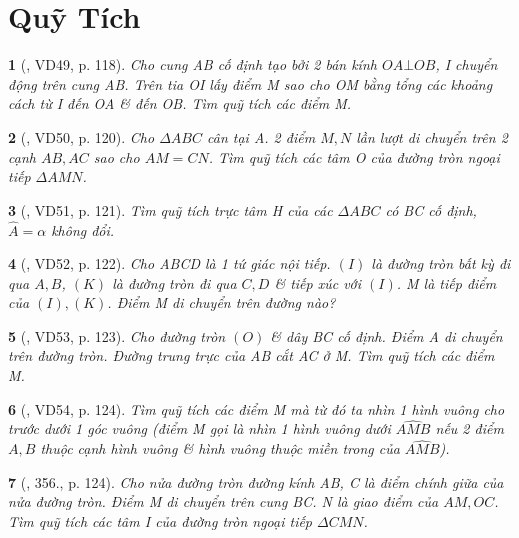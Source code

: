 \documentclass{article}
\newtheorem{baitoan}{}
\begin{document}
\section{Quỹ Tích}

\begin{baitoan}[\cite{Binh_Toan_9_tap_2}, VD49, p. 118]
	Cho cung AB cố định tạo bởi 2 bán kính $OA\bot OB$, I chuyển động trên cung AB. Trên tia OI lấy điểm M sao cho OM bằng tổng các khoảng cách từ I đến OA \& đến OB. Tìm quỹ tích các điểm M.
\end{baitoan}

\begin{baitoan}[\cite{Binh_Toan_9_tap_2}, VD50, p. 120]
	Cho $\Delta ABC$ cân tại A. 2 điểm $M,N$ lần lượt di chuyển trên 2 cạnh $AB,AC$ sao cho $AM = CN$. Tìm quỹ tích các tâm O của đường tròn ngoại tiếp $\Delta AMN$.
\end{baitoan}

\begin{baitoan}[\cite{Binh_Toan_9_tap_2}, VD51, p. 121]
	Tìm quỹ tích trực tâm H của các $\Delta ABC$ có BC cố định, $\widehat{A} = \alpha$ không đổi.
\end{baitoan}

\begin{baitoan}[\cite{Binh_Toan_9_tap_2}, VD52, p. 122]
	Cho ABCD là 1 tứ giác nội tiếp. $(I)$ là đường tròn bất kỳ đi qua $A,B$, $(K)$ là đường tròn đi qua $C,D$ \& tiếp xúc với $(I)$. M là tiếp điểm của $(I),(K)$. Điểm M di chuyển trên đường nào?
\end{baitoan}

\begin{baitoan}[\cite{Binh_Toan_9_tap_2}, VD53, p. 123]
	Cho đường tròn $(O)$ \& dây BC cố định. Điểm A di chuyển trên đường tròn. Đường trung trực của AB cắt AC ở M. Tìm quỹ tích các điểm M.
\end{baitoan}

\begin{baitoan}[\cite{Binh_Toan_9_tap_2}, VD54, p. 124]
	Tìm quỹ tích các điểm M mà từ đó ta nhìn 1 hình vuông cho trước dưới 1 góc vuông (điểm M gọi là {\rm nhìn 1 hình vuông dưới $\widehat{AMB}$} nếu 2 điểm $A,B$ thuộc cạnh hình vuông \& hình vuông thuộc miền trong của $\widehat{AMB}$).
\end{baitoan}

\begin{baitoan}[\cite{Binh_Toan_9_tap_2}, 356., p. 124]
	Cho nửa đường tròn đường kính AB, C là điểm chính giữa của nửa đường tròn. Điểm M di chuyển trên cung BC. N là giao điểm của $AM,OC$. Tìm quỹ tích các tâm I của đường tròn ngoại tiếp $\Delta CMN$.
\end{baitoan}
\end{document}
